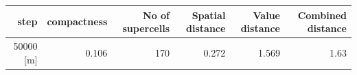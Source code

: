 
\begin{tabular}{r|r|r|r|r|r}
\hline
step & compactness & No of supercells & Spatial distance & Value distance & Combined distance\\
\hline
50000 [m] & 0.106 & 170 & 0.272 & 1.569 & 1.63\\
\hline
\end{tabular}
